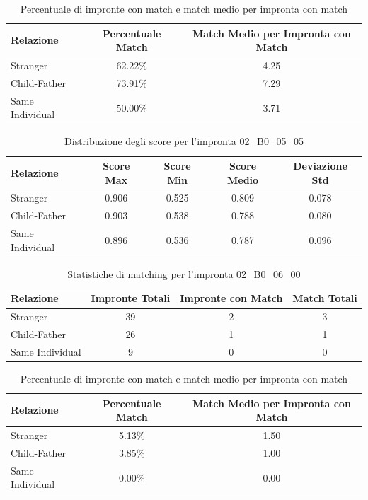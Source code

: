 \begin{table}[htbp]
\centering
\caption{Percentuale di impronte con match e match medio per impronta con match}
\label{tab:match_percentage_02_B0_05_05}
\begin{tabular}{|l|c|c|}
\hline
\textbf{Relazione} & \textbf{Percentuale Match} & \textbf{Match Medio per Impronta con Match} \\
\hline
Stranger & 62.22\% & 4.25 \\
\hline
Child-Father & 73.91\% & 7.29 \\
\hline
Same Individual & 50.00\% & 3.71 \\
\hline
\end{tabular}
\end{table}


\begin{table}[htbp]
\centering
\caption{Distribuzione degli score per l'impronta 02\_B0\_05\_05}
\label{tab:scores_02_B0_05_05}
\begin{tabular}{|l|c|c|c|c|}
\hline
\textbf{Relazione} & \textbf{Score Max} & \textbf{Score Min} & \textbf{Score Medio} & \textbf{Deviazione Std} \\
\hline
Stranger & 0.906 & 0.525 & 0.809 & 0.078 \\
\hline
Child-Father & 0.903 & 0.538 & 0.788 & 0.080 \\
\hline
Same Individual & 0.896 & 0.536 & 0.787 & 0.096 \\
\hline
\end{tabular}
\end{table}


\begin{table}[htbp]
\centering
\caption{Statistiche di matching per l'impronta 02\_B0\_06\_00}
\label{tab:results_02_B0_06_00}
\begin{tabular}{|l|c|c|c|}
\hline
\textbf{Relazione} & \textbf{Impronte Totali} & \textbf{Impronte con Match} & \textbf{Match Totali} \\
\hline
Stranger & 39 & 2 & 3 \\
\hline
Child-Father & 26 & 1 & 1 \\
\hline
Same Individual & 9 & 0 & 0 \\
\hline
\end{tabular}
\end{table}


\begin{table}[htbp]
\centering
\caption{Percentuale di impronte con match e match medio per impronta con match}
\label{tab:match_percentage_02_B0_06_00}
\begin{tabular}{|l|c|c|}
\hline
\textbf{Relazione} & \textbf{Percentuale Match} & \textbf{Match Medio per Impronta con Match} \\
\hline
Stranger & 5.13\% & 1.50 \\
\hline
Child-Father & 3.85\% & 1.00 \\
\hline
Same Individual & 0.00\% & 0.00 \\
\hline
\end{tabular}
\end{table}


